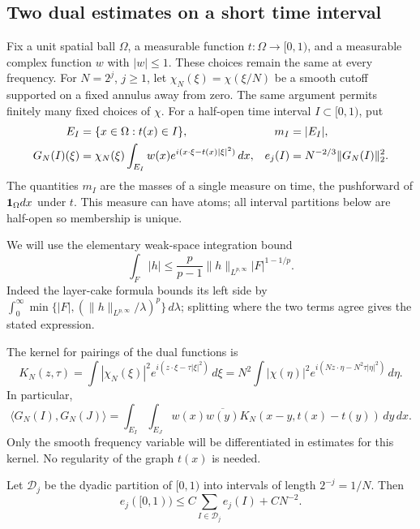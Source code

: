 \subsection{Two dual estimates on a short time interval}

Fix a unit spatial ball $\Omega$, a measurable function
$t:\Omega\to[0,1)$, and a measurable complex function $w$ with $|w|\le1$.
These choices remain the same at every frequency.  For $N=2^j$, $j\ge1$,
let $\chi_N(\xi)=\chi(\xi/N)$ be a smooth cutoff supported on a fixed
annulus away from zero.  The same argument permits finitely many fixed
choices of $\chi$.  For a half-open time interval $I\subset[0,1)$, put
\begin{align}
 E_I&=\{x\in\Omega:t(x)\in I\},
 &m_I&=|E_I|,\notag\\
 G_N(I)(\xi)&=\chi_N(\xi)\int_{E_I}
              w(x)e^{i(x\cdot\xi-t(x)|\xi|^2)}\,dx,
 &e_j(I)&=N^{-2/3}\|G_N(I)\|_2^2.
 \label{eq:endpoint-dual-definitions}
\end{align}
The quantities $m_I$ are the masses of a single measure on time, the
pushforward of ${\bf1}_\Omega dx$ under $t$.  This measure can have atoms;
all interval partitions below are half-open so membership is unique.

We will use the elementary weak-space integration bound
\begin{equation}
 \int_F |h|\le \frac{p}{p-1}
             \|h\|_{L^{p,\infty}}|F|^{1-1/p}.
 \label{eq:endpoint-weak-integration}
\end{equation}
Indeed the layer-cake formula bounds its left side by
$\int_0^\infty\min\{|F|,(\|h\|_{L^{p,\infty}}/\lambda)^p\}\,d\lambda$;
splitting where the two terms agree gives the stated expression.

The kernel for pairings of the dual functions is
\begin{equation}
 K_N(z,\tau)=\int |\chi_N(\xi)|^2
                   e^{i(z\cdot\xi-\tau|\xi|^2)}\,d\xi
 =N^2\int|\chi(\eta)|^2
                   e^{i(Nz\cdot\eta-N^2\tau|\eta|^2)}\,d\eta.
 \label{eq:endpoint-kernel}
\end{equation}
In particular,
\[
 \langle G_N(I),G_N(J)\rangle
 =\int_{E_I}\int_{E_J}w(x)\overline{w(y)}
       K_N(x-y,t(x)-t(y))\,dy\,dx.
\]
Only the smooth frequency variable will be differentiated in estimates
for this kernel.  No regularity of the graph $t(x)$ is needed.

\begin{lemma}
\label{lem:endpoint-time-separation}
Let $\mathcal D_j$ be the dyadic partition of $[0,1)$ into intervals of
length $2^{-j}=1/N$.  Then
\begin{equation}
 e_j([0,1))\le C\sum_{I\in\mathcal D_j}e_j(I)+CN^{-2}.
 \label{eq:endpoint-time-almost-orthogonality}
\end{equation}
\end{lemma}

